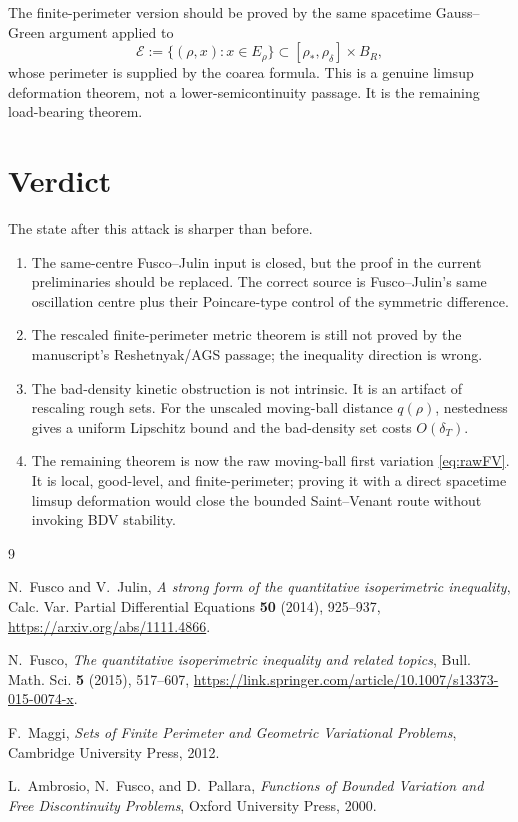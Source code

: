 \documentclass[11pt]{article}
\theoremstyle{definition}
\newcommand{\dT}{\delta_T}
\newcommand{\rstar}{\rho_*}
\newcommand{\rdel}{\rho_\delta}
\begin{document}
The finite-perimeter version should be proved by the same spacetime
Gauss--Green argument applied to
\[
   \mathcal E:=\{(\rho,x):x\in E_\rho\}\subset[\rstar,\rdel]\times B_R,
\]
whose perimeter is supplied by the coarea formula.  This is a genuine limsup
deformation theorem, not a lower-semicontinuity passage.  It is the remaining
load-bearing theorem.

\section{Verdict}

The state after this attack is sharper than before.

\begin{enumerate}[leftmargin=2em]
\item The same-centre Fusco--Julin input is closed, but the proof in the
current preliminaries should be replaced.  The correct source is
Fusco--Julin's same oscillation centre plus their Poincare-type control of
the symmetric difference.
\item The rescaled finite-perimeter metric theorem is still not proved by
the manuscript's Reshetnyak/AGS passage; the inequality direction is wrong.
\item The bad-density kinetic obstruction is not intrinsic.  It is an
artifact of rescaling rough sets.  For the unscaled moving-ball distance
\(q(\rho)\), nestedness gives a uniform Lipschitz bound and the bad-density
set costs \(O(\dT)\).
\item The remaining theorem is now the raw moving-ball first variation
\eqref{eq:rawFV}.  It is local, good-level, and finite-perimeter; proving it
with a direct spacetime limsup deformation would close the bounded
Saint--Venant route without invoking BDV stability.
\end{enumerate}

\begin{thebibliography}{9}

N.~Fusco and V.~Julin,
\emph{A strong form of the quantitative isoperimetric inequality},
Calc. Var. Partial Differential Equations \textbf{50} (2014), 925--937,
\url{https://arxiv.org/abs/1111.4866}.

N.~Fusco,
\emph{The quantitative isoperimetric inequality and related topics},
Bull. Math. Sci. \textbf{5} (2015), 517--607,
\url{https://link.springer.com/article/10.1007/s13373-015-0074-x}.

F.~Maggi,
\emph{Sets of Finite Perimeter and Geometric Variational Problems},
Cambridge University Press, 2012.

L.~Ambrosio, N.~Fusco, and D.~Pallara,
\emph{Functions of Bounded Variation and Free Discontinuity Problems},
Oxford University Press, 2000.

\end{thebibliography}
\end{document}
